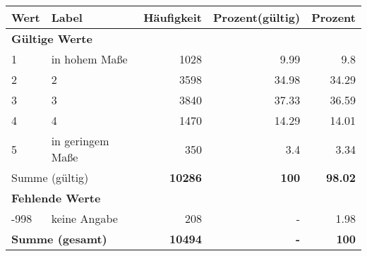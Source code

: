      \begin{longtable}{lXrrr}
     \toprule
     \textbf{Wert} & \textbf{Label} & \textbf{Häufigkeit} & \textbf{Prozent(gültig)} & \textbf{Prozent} \\
     \endhead
     \midrule
     \multicolumn{5}{l}{\textbf{Gültige Werte}}\\

     1 &
     \multicolumn{1}{X}{ in hohem Maße   } &


       \num{1028} &
       \num[round-mode=places,round-precision=2]{9.99} &
         \num[round-mode=places,round-precision=2]{9.8} \\

     2 &
     \multicolumn{1}{X}{ 2   } &


       \num{3598} &
       \num[round-mode=places,round-precision=2]{34.98} &
         \num[round-mode=places,round-precision=2]{34.29} \\

     3 &
     \multicolumn{1}{X}{ 3   } &


       \num{3840} &
       \num[round-mode=places,round-precision=2]{37.33} &
         \num[round-mode=places,round-precision=2]{36.59} \\

     4 &
     \multicolumn{1}{X}{ 4   } &


       \num{1470} &
       \num[round-mode=places,round-precision=2]{14.29} &
         \num[round-mode=places,round-precision=2]{14.01} \\

     5 &
     \multicolumn{1}{X}{ in geringem Maße   } &


       \num{350} &
       \num[round-mode=places,round-precision=2]{3.4} &
         \num[round-mode=places,round-precision=2]{3.34} \\
     \midrule
     \multicolumn{2}{l}{Summe (gültig)} &
       \textbf{\num{10286}} &
     \textbf{\num{100}} &
       \textbf{\num[round-mode=places,round-precision=2]{98.02}} \\
     \multicolumn{5}{l}{\textbf{Fehlende Werte}}\\
       -998 &
       keine Angabe &
         \num{208} &
        - &
         \num[round-mode=places,round-precision=2]{1.98} \\
     \midrule
     \multicolumn{2}{l}{\textbf{Summe (gesamt)}} &
          \textbf{\num{10494}} &
        \textbf{-} &
        \textbf{\num{100}} \\
     \bottomrule
     \end{longtable}
     

